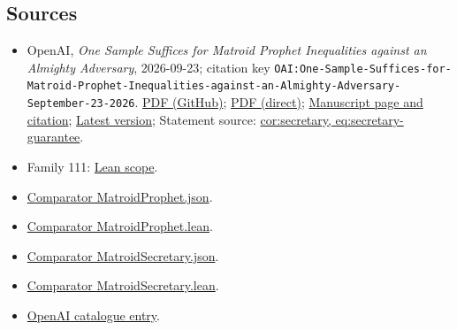 \documentclass[11pt]{article}
\begin{document}
\subsection{Sources}
\begin{itemize}
\item OpenAI, \emph{One Sample Suffices for Matroid Prophet Inequalities against an Almighty Adversary}, 2026-09-23; citation key \texttt{OAI:One-Sample-Suffices-for-Matroid-Prophet-Inequalities-against-an-Almighty-Adversary-September-23-2026}. \href{https://github.com/openai/math/blob/adc7f1241b42e322a6451854ab7e4b4c146bf78a/preprints/One-Sample-Suffices-for-Matroid-Prophet-Inequalities-against-an-Almighty-Adversary-September-23-2026/final.pdf}{PDF (GitHub)}; \href{https://github.com/openai/math/raw/adc7f1241b42e322a6451854ab7e4b4c146bf78a/preprints/One-Sample-Suffices-for-Matroid-Prophet-Inequalities-against-an-Almighty-Adversary-September-23-2026/final.pdf}{PDF (direct)}; \href{https://github.com/openai/math/blob/adc7f1241b42e322a6451854ab7e4b4c146bf78a/preprints/One-Sample-Suffices-for-Matroid-Prophet-Inequalities-against-an-Almighty-Adversary-September-23-2026/README.md}{Manuscript page and citation}; \href{https://github.com/openai/math/blob/main/preprints/One-Sample-Suffices-for-Matroid-Prophet-Inequalities-against-an-Almighty-Adversary-September-23-2026/final.pdf}{Latest version}; Statement source: \href{https://github.com/openai/math/blob/adc7f1241b42e322a6451854ab7e4b4c146bf78a/preprints/One-Sample-Suffices-for-Matroid-Prophet-Inequalities-against-an-Almighty-Adversary-September-23-2026/build/sections/secretary.tex\#L21}{cor:secretary, eq:secretary-guarantee}.
\item Family 111: \href{https://github.com/openai/math/blob/adc7f1241b42e322a6451854ab7e4b4c146bf78a/lean/docs/111.md}{Lean scope}.
\item \href{https://github.com/openai/math/blob/adc7f1241b42e322a6451854ab7e4b4c146bf78a/lean/ComparatorChallenges/MatroidProphet.json}{Comparator MatroidProphet.json}.
\item \href{https://github.com/openai/math/blob/adc7f1241b42e322a6451854ab7e4b4c146bf78a/lean/ComparatorChallenges/MatroidProphet.lean}{Comparator MatroidProphet.lean}.
\item \href{https://github.com/openai/math/blob/adc7f1241b42e322a6451854ab7e4b4c146bf78a/lean/ComparatorChallenges/MatroidSecretary.json}{Comparator MatroidSecretary.json}.
\item \href{https://github.com/openai/math/blob/adc7f1241b42e322a6451854ab7e4b4c146bf78a/lean/ComparatorChallenges/MatroidSecretary.lean}{Comparator MatroidSecretary.lean}.
\item \href{https://github.com/openai/math/blob/adc7f1241b42e322a6451854ab7e4b4c146bf78a/CONTENTS.md}{OpenAI catalogue entry}.
\end{itemize}
\end{document}
